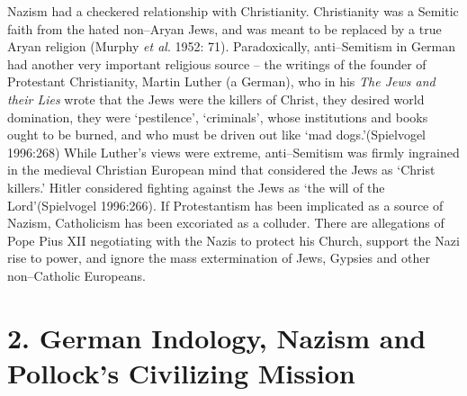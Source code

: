 Nazism had a checkered relationship with Christianity. Christianity was a Semitic faith from the hated non–Aryan Jews, and was meant to be replaced by a true Aryan religion (Murphy \textit{et al}. 1952: 71). Paradoxically, anti–Semitism in German had another very important religious source – the writings of the founder of Protestant Christianity, Martin Luther (a German), who in his \textit{The Jews and their Lies} wrote that the Jews were the killers of Christ, they desired world domination, they were ‘pestilence’, ‘criminals’, whose institutions and books ought to be burned, and who must be driven out like ‘mad dogs.’(Spielvogel 1996:268) While Luther’s views were extreme, anti–Semitism was firmly ingrained in the medieval Christian European mind that considered the Jews as ‘Christ killers.’ Hitler considered fighting against the Jews as ‘the will of the Lord’(Spielvogel 1996:266). If Protestantism has been implicated as a source of Nazism, Catholicism has been excoriated as a colluder. There are allegations of Pope Pius XII negotiating with the Nazis to protect his Church, support the Nazi rise to power, and ignore the mass extermination of Jews, Gypsies and other non–Catholic Europeans.


\section*{2. German Indology, Nazism and Pollock’s Civilizing Mission}


